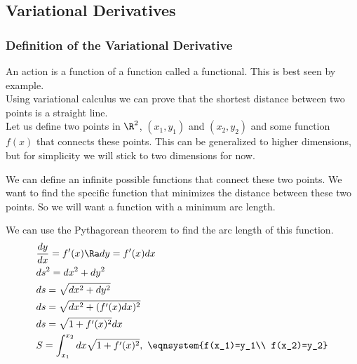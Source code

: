 \subsection{Variational Derivatives}
\subsubsection{Definition of the Variational Derivative}

An action is a function of a function called a functional. This is best seen by example.\\
Using variational calculus we can prove that the shortest distance between two points is a straight line.\\
Let us define two points in $\R^2$, $(x_1,y_1)$ and $(x_2,y_2)$ and some function $f(x)$ that connects these points. This can be generalized to higher dimensions, but for simplicity we will stick to two dimensions for now.\\
\begin{center}
\end{center}
We can define an infinite possible functions that connect these two points. We want to find the specific function that minimizes the distance between these two points. So we will want a function with a minimum arc length.
\begin{center}
\end{center}
We can use the Pythagorean theorem to find the arc length of this function.
\begin{align*}
    &\frac{dy}{dx}=f'(x)\Ra dy=f'(x)dx\\
    &ds^2=dx^2+dy^2\\
    &ds=\sqrt{dx^2+dy^2}\\
    &ds=\sqrt{dx^2+(f'(x)dx)^2}\\
    &ds=\sqrt{1+f'(x)^2}dx\\
    &S=\int_{x_1}^{x_2}dx\sqrt{1+f'(x)^2},\ \eqnsystem{f(x_1)=y_1\\ f(x_2)=y_2}
\end{align*}
